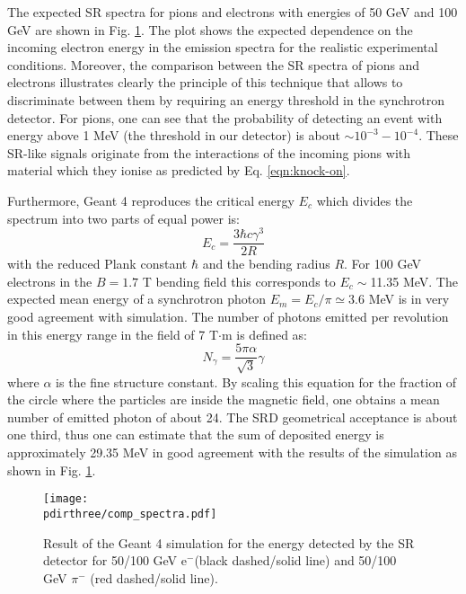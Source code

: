 The expected SR spectra for pions and electrons with energies of 50 GeV and 100 GeV are shown in Fig. \ref{fig:SRspectrum}. The plot shows the expected dependence on the incoming electron energy in the emission spectra for the realistic experimental conditions.
Moreover, the comparison between the SR spectra of pions and electrons illustrates clearly the principle of this technique that allows to discriminate between them by requiring an energy threshold in the synchrotron detector. 
For pions, one can see that the probability of detecting an event with energy above 1 MeV (the threshold in our detector) is about $\sim 10^{-3}-10^{-4}$.
These SR-like signals originate from the interactions of the incoming pions with material which they ionise as predicted by Eq. \ref{eqn:knock-on}.
 \par 
Furthermore, Geant 4 reproduces the critical energy $E_c$ which divides the spectrum into two parts of equal power is:
\begin{equation}
E_c = \frac{3 \hbar c \gamma^3}{2R}
\end{equation}
with the reduced Plank constant $\hbar$ and the bending radius $R$. 
 For 100 GeV electrons in the  $B=1.7$ T bending field this corresponds to $E_c\sim$11.35 MeV. The expected mean energy of a synchrotron photon $E_m=E_c/\pi\simeq 3.6$ MeV is in very good agreement with simulation. The number of photons emitted per revolution in this energy range in the field of 7 T$\cdot$m is defined as:
\begin{equation}
N_\gamma = \frac{5 \pi \alpha}{\sqrt{3}}\gamma
\end{equation}
where $\alpha$ is the fine structure constant. 
By scaling this equation for the fraction of the circle where the particles are inside the magnetic field, one obtains a mean number of emitted photon of about 24.
The SRD geometrical acceptance is about one third,  thus one can estimate that the sum of deposited energy is approximately 29.35 MeV in good agreement with the results of the simulation as shown in Fig. \ref{fig:SRspectrum}. 
 
\begin{figure}[htb!]
\centering
\texttt{[image: \\pdirthree/comp\_spectra.pdf]}
\caption[SR spectrum for different energy detected in the SRD]{Result of the Geant 4 simulation for the energy detected by the SR detector for 50/100 GeV e$^-$(black dashed/solid line) and 50/100 GeV $\pi^-$ (red dashed/solid line).}
\label{fig:SRspectrum}
\end{figure}

